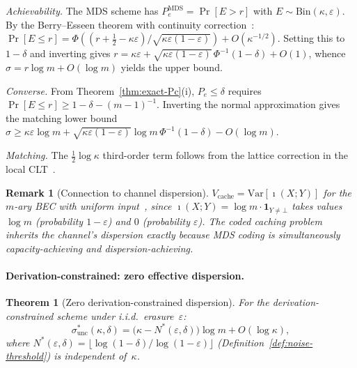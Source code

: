 \documentclass[journal]{IEEEtran}
\makeatletter
\newtheorem{theorem}{Theorem}[section]
\newtheorem{remark}{Remark}[section]
\numberwithin{equation}{section}
\renewenvironment{proof}[1][\proofname]{\par
  \pushQED{\qed}%
  \normalfont \topsep6\p@\@plus6\p@\relax
  \trivlist
  \item[\hskip\labelsep
        \itshape
    #1\@addpunct{.}]\ignorespaces
}{%
  \popQED\endtrivlist\@endpefalse
}
\makeatother
\begin{document}
\begin{proof}
\emph{Achievability.}\;
The MDS scheme has $P_e^{\mathrm{MDS}}=\Pr[E>r]$ with
$E\sim\mathrm{Bin}(\kappa,\varepsilon)$.
By the Berry--Esseen theorem with continuity
correction~\cite{feller1991introduction}:
$\Pr[E\le r]
=\Phi((r{+}\frac{1}{2}{-}\kappa\varepsilon)
/\sqrt{\kappa\varepsilon(1{-}\varepsilon)})
+O(\kappa^{-1/2})$.
Setting this to $1{-}\delta$ and inverting gives
$r=\kappa\varepsilon
+\sqrt{\kappa\varepsilon(1{-}\varepsilon)}\,
\Phi^{-1}(1{-}\delta)+O(1)$,
whence $\sigma=r\log m+O(\log m)$
yields the upper bound.

\emph{Converse.}\;
From Theorem~\ref{thm:exact-Pc}(i), $P_e\le\delta$
requires $\Pr[E\le r]\ge 1{-}\delta{-}(m{-}1)^{-1}$.
Inverting the normal approximation gives the matching
lower bound $\sigma\ge\kappa\varepsilon\log m
+\sqrt{\kappa\varepsilon(1{-}\varepsilon)}\log m\,
\Phi^{-1}(1{-}\delta)-O(\log m)$.

\emph{Matching.}\;
The $\frac{1}{2}\log\kappa$ third-order term follows
from the lattice correction in the local
CLT~\cite{petrov2012sums}.
\end{proof}

\begin{remark}[Connection to channel dispersion]
\label{rem:channel-dispersion}
$V_{\mathrm{cache}}
=\mathrm{Var}[\imath(X;Y)]$ for the $m$-ary BEC with
uniform input~\cite{polyanskiy2010channel}, since
$\imath(X;Y)=\log m\cdot\mathbf{1}_{Y\ne\bot}$
takes values $\log m$ (probability $1{-}\varepsilon$) and
$0$ (probability $\varepsilon$).
The coded caching problem inherits the channel's dispersion
exactly because MDS coding is simultaneously
capacity-achieving and dispersion-achieving.
\end{remark}

\paragraph{Derivation-constrained: zero effective dispersion.}

\begin{theorem}[Zero derivation-constrained dispersion]
\label{thm:unc-second-order}
For the derivation-constrained scheme under i.i.d.\
erasure~$\varepsilon$:
\begin{equation}\label{eq:unc-second-order}
  \sigma^*_{\mathrm{unc}}(\kappa,\delta)
  =\bigl(\kappa-N^*(\varepsilon,\delta)\bigr)\log m+O(\log\kappa),
\end{equation}
where
$N^*(\varepsilon,\delta)
=\lfloor\log(1{-}\delta)/\log(1{-}\varepsilon)\rfloor$
\textup{(Definition~\ref{def:noise-threshold})}
is independent of~$\kappa$.
\end{theorem}
\end{document}
